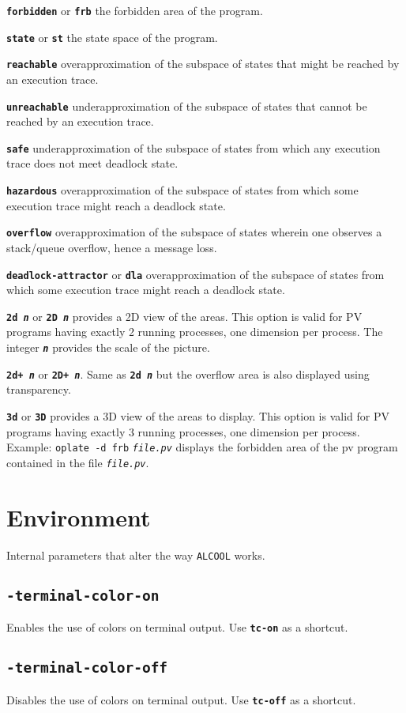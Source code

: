 \documentclass[article,11pt]{amsbook}
\def\bv#1{{\bf\texttt{#1}}}
\def\alcool{\texttt{ALCOOL} }
\begin{document}
\bv{forbidden} or \bv{frb} the forbidden area of the program.

\bv{state} or \bv{st} the state space of the program.

\bv{reachable} overapproximation of the subspace of states that might be reached by an execution trace.

\bv{unreachable} underapproximation of the subspace of states that
cannot be reached by an execution trace.

\bv{safe} underapproximation of the subspace of states from which any
execution trace does not meet deadlock state.

\bv{hazardous} overapproximation of the subspace of states from which
some execution trace might reach a deadlock state.

\bv{overflow} overapproximation of the subspace of states wherein one
observes a stack/queue overflow, hence a message loss.

\bv{deadlock-attractor} or \bv {dla} overapproximation of the subspace of states from which
some execution trace might reach a deadlock state.

\bv{2d {\em n}} or \bv {2D {\em n}} provides a 2D view of the areas. This option is
valid for PV programs having exactly 2 running processes, one dimension
per process. The integer \bv{\em n} provides the scale of the picture.

\bv{2d+ {\em n}} or \bv {2D+ {\em n}}. Same as \bv{2d {\em n}} but the overflow area
is also displayed using transparency.

\bv{3d} or \bv {3D} provides a 3D view of the areas to display. This
option is valid for PV programs having exactly 3 running processes, one
dimension per process.
\\

\noindent Example: \texttt{oplate -d frb} \texttt{\em file.pv} displays
the forbidden area of the pv program contained in the file \texttt{\em file.pv}.
%
\section{Environment}\noindent
Internal parameters that alter the way \alcool works.
\subsection{\texttt{-terminal-color-on}} Enables the use
of colors on terminal output. Use \bv {tc-on} as a shortcut.
\subsection{\texttt{-terminal-color-off}} Disables the use
of colors on terminal output. Use \bv {tc-off} as a shortcut.
\end{document}
